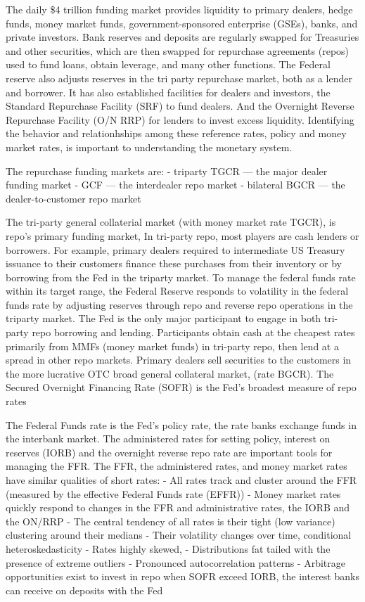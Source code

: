 \documentclass[
]{article}
\begin{document}
The daily \$4 trillion funding market provides liquidity to primary dealers, hedge funds, money market funds, government-sponsored enterprise (GSEs), banks, and private investors. Bank reserves and deposits are regularly swapped for Treasuries and other securities, which are then swapped for repurchase agreements (repos) used to fund loans, obtain leverage, and many other functions. The Federal reserve also adjusts reserves in the tri party repurchase market, both as a lender and borrower. It has also established facilities for dealers and investors, the Standard Repurchase Facility (SRF) to fund dealers. And the Overnight Reverse Repurchase Facility (O/N RRP) for lenders to invest excess liquidity. Identifying the behavior and relationhships among these reference rates, policy and money market rates, is important to understanding the monetary system.

The repurchase funding markets are:
- triparty TGCR --- the major dealer funding market
- GCF --- the interdealer repo market
- bilateral BGCR --- the dealer-to-customer repo market

The tri-party general collaterial market (with money market rate TGCR), is repo's primary funding market, In tri-party repo, most players are cash lenders or borrowers. For example, primary dealers required to intermediate US Treasury issuance to their customers finance these purchases from their inventory or by borrowing from the Fed in the triparty market. To manage the federal funds rate within its target range, the Federal Reserve responds to volatility in the federal funds rate by adjusting reserves through repo and reverse repo operations in the triparty market. The Fed is the only major participant to engage in both tri-party repo borrowing and lending. Participants obtain cash at the cheapest rates primarily from MMFs (money market funds) in tri-party repo, then lend at a spread in other repo markets. Primary dealers sell securities to the customers in the more lucrative OTC broad general collateral market, (rate BGCR). The Secured Overnight Financing Rate (SOFR) is the Fed's broadest measure of repo rates

The Federal Funds rate is the Fed's policy rate, the rate banks exchange funds in the interbank market. The administered rates for setting policy, interest on reserves (IORB) and the overnight reverse repo rate are important tools for managing the FFR. The FFR, the administered rates, and money market rates have similar qualities of short rates:
- All rates track and cluster around the FFR (measured by the effective Federal Funds rate (EFFR))
- Money market rates quickly respond to changes in the FFR and administrative rates, the IORB and the ON/RRP
- The central tendency of all rates is their tight (low variance) clustering around their medians
- Their volatility changes over time, conditional heteroskedasticity
- Rates highly skewed,
- Distributions fat tailed with the presence of extreme outliers
- Pronounced autocorrelation patterns
- Arbitrage opportunities exist to invest in repo when SOFR exceed IORB, the interest banks can receive on deposits with the Fed
\end{document}
